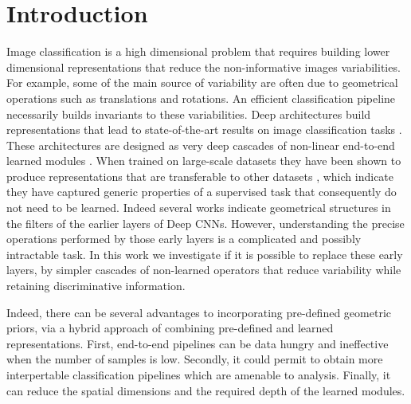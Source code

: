 \documentclass[10pt,twocolumn,letterpaper]{article}
\newcommand{\citep}{\cite}
\begin{document}
\section{Introduction}
Image classification is a high dimensional problem that requires building lower dimensional representations that reduce the non-informative images variabilities. For example, some of the main source of variability are often due to geometrical operations such as translations and rotations. An efficient classification pipeline necessarily builds invariants to these variabilities. Deep architectures build representations that lead to state-of-the-art results on image classification tasks \citep{he2015deep}. These architectures are designed as very deep cascades of non-linear end-to-end learned modules \citep{lecun2010convolutional}.  When trained on large-scale datasets they have been shown to produce representations that are transferable to other datasets \citep{zeiler2014visualizing,huh2016makes}, which indicate they have captured generic properties of a supervised task that consequently do not need to be learned. Indeed several works indicate geometrical structures in the filters of the earlier layers \cite{krizhevsky2012imagenet,waldspurger2015these} of Deep CNNs. However, understanding the precise operations performed by those early layers is a complicated \cite{szegedy2013intriguing,oyallon2017building} and possibly intractable task. In this work we investigate if it is possible to replace these early layers, by simpler cascades of non-learned operators that reduce variability while retaining discriminative information.

Indeed, there can be several advantages to incorporating pre-defined geometric priors, via a hybrid approach of combining pre-defined and learned representations. First, end-to-end pipelines can be data hungry and ineffective when the number of samples is low. Secondly, it could permit to obtain more interpertable classification pipelines which are amenable to analysis. Finally, it can reduce the spatial dimensions and the required depth of the learned modules.
\end{document}
